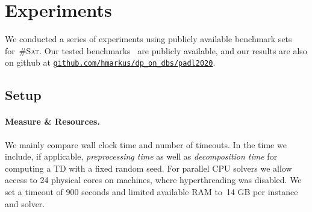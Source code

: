 \documentclass{llncs}
\newcommand{\cSAT}{\textsc{\#Sat}\xspace}%
\begin{document}



\section{Experiments}
\label{sec:experiments}
%
We conducted a series of experiments using publicly available benchmark sets for~\cSAT.
Our tested benchmarks~\cite{FichteEtAl18b} 
are publicly available,
and our results are
also on github at
\href{https://github.com/hmarkus/dp_on_dbs/tree/padl2020}{\nolinkurl{github.com/hmarkus/dp_on_dbs/padl2020}}.

\subsection{Setup}

\paragraph{Measure \& Resources.}
We mainly compare wall clock time and number of
timeouts. 
In the time we include, if applicable, \emph{preprocessing
  time} as well as \emph{decomposition time} for computing a %
TD with a fixed random seed. %
%
%
For parallel CPU solvers we allow access to 24 physical cores on
machines, where hyperthreading was disabled.
%
%
%
%
%
We set a timeout of 900 seconds and limited available RAM to~14 GB per
instance and solver.
\end{document}
